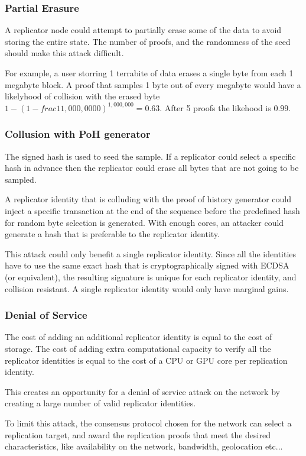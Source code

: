 \documentclass[12pt]{article}
\begin{document}
\subsubsection{Partial Erasure}

A replicator node could attempt to partially erase some of the data to avoid storing the entire state. The number of proofs, and the randomness of the seed should make this attack difficult.

For example, a user storring 1 terrabite of data erases a single byte from each 1 megabyte block.  A proof that samples 1 byte out of every megabyte would have a likelyhood of collision with the erased byte \(1 - (1- frac{1}{1,000,0000})^{1,000,000} = 0.63\).  After 5 proofs the likehood is \(0.99\).

\subsubsection{Collusion with PoH generator}

The signed hash is used to seed the sample. If a replicator could select a specific hash in advance then the replicator could erase all bytes that are not going to be sampled.

A replicator identity that is colluding with the proof of history generator could inject a specific transaction at the end of the sequence before the predefined hash for random byte selection is generated. With enough cores, an attacker could generate a hash that is preferable to the replicator identity.

This attack could only benefit a single replicator identity. Since all the identities have to use the same exact hash that is cryptographically signed with ECDSA (or equivalent), the resulting signature is unique for each replicator identity, and collision resistant. A single replicator identity would only have marginal gains.
\subsubsection{Denial of Service}
The cost of adding an additional replicator identity is equal to the cost of storage. The cost of adding extra computational capacity to verify all the replicator identities is equal to the cost of a CPU or GPU core per replication identity.

This creates an opportunity for a denial of service attack on the network by creating a large number of valid replicator identities.

To limit this attack, the consensus protocol chosen for the network can select a replication target, and award the replication proofs that meet the desired characteristics, like availability on the network, bandwidth, geolocation etc...
\end{document}
